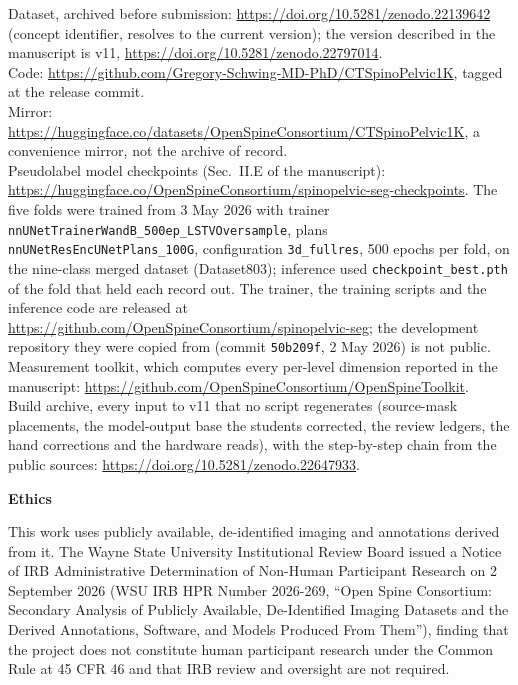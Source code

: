 \documentclass[12pt]{article}
\newcommand{\buildarchivedoi}{10.5281/zenodo.22647933}   %
\begin{document}
\noindent Dataset, archived before submission:
\url{https://doi.org/10.5281/zenodo.22139642} (concept identifier, resolves to the current
version); the version described in the manuscript is v11,
\url{https://doi.org/10.5281/zenodo.22797014}.\\
Code: \url{https://github.com/Gregory-Schwing-MD-PhD/CTSpinoPelvic1K}, tagged at the release
commit.\\
Mirror: \url{https://huggingface.co/datasets/OpenSpineConsortium/CTSpinoPelvic1K}, a
convenience mirror, not the archive of record.\\
Pseudolabel model checkpoints (Sec.~II.E of the manuscript):
\url{https://huggingface.co/OpenSpineConsortium/spinopelvic-seg-checkpoints}. The five folds
were trained from 3 May 2026 with trainer
\texttt{nnUNetTrainerWandB\_500ep\_LSTVOversample}, plans \texttt{nnUNetResEncUNetPlans\_100G},
configuration \texttt{3d\_fullres}, 500 epochs per fold, on the nine-class merged dataset
(Dataset803); inference used \texttt{checkpoint\_best.pth} of the fold that held each record
out. The trainer, the training scripts and the inference code are released at
\url{https://github.com/OpenSpineConsortium/spinopelvic-seg}; the development repository
they were copied from (commit \texttt{50b209f}, 2 May 2026) is not public.\\
Measurement toolkit, which computes every per-level dimension reported in the
manuscript: \url{https://github.com/OpenSpineConsortium/OpenSpineToolkit}.\\
Build archive, every input to v11 that no script regenerates (source-mask placements, the
model-output base the students corrected, the review ledgers, the hand corrections and the
hardware reads), with the step-by-step chain from the public sources:
\url{https://doi.org/\buildarchivedoi}.

\vspace{1em}
\noindent\textbf{Ethics}

\noindent This work uses publicly available, de-identified imaging and annotations derived
from it. The Wayne State University Institutional Review Board issued a Notice of IRB
Administrative Determination of Non-Human Participant Research on 2 September 2026
(WSU IRB HPR Number 2026-269, ``Open Spine Consortium: Secondary Analysis of Publicly
Available, De-Identified Imaging Datasets and the Derived Annotations, Software, and Models
Produced From Them''), finding that the project does not constitute human participant
research under the Common Rule at 45 CFR 46 and that IRB review and oversight are not
required.
\end{document}

